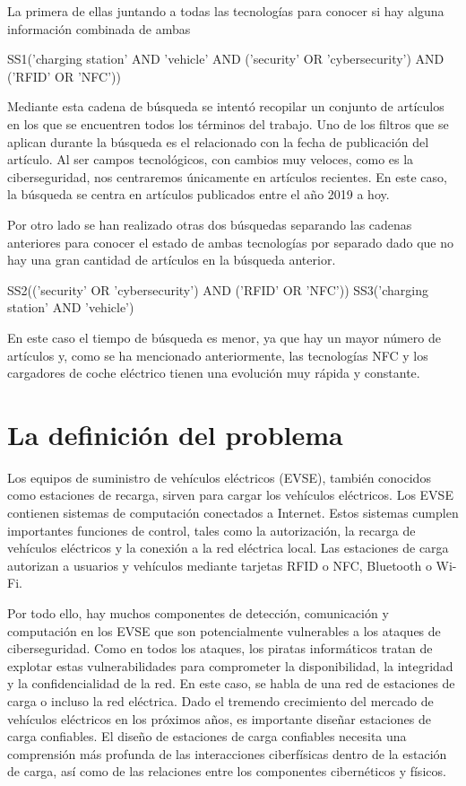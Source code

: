 \documentclass[12pt,a4paper,onecolumn,oneside]{report}
\begin{document}
La primera de ellas juntando a todas las tecnologías para conocer si hay alguna información combinada de ambas

SS1('charging station' AND 'vehicle' AND ('security' OR 'cybersecurity') AND ('RFID' OR 'NFC'))

Mediante esta cadena de búsqueda se intentó recopilar un conjunto de artículos en los que se encuentren todos los términos del trabajo. Uno de los filtros que se aplican durante la búsqueda es el relacionado con la fecha de publicación del artículo. Al ser campos tecnológicos, con cambios muy veloces, como es la ciberseguridad, nos centraremos únicamente en artículos recientes. En este caso, la búsqueda se centra en artículos publicados entre el año 2019 a hoy.

Por otro lado se han realizado otras dos búsquedas separando las cadenas anteriores para conocer el estado de ambas tecnologías por separado dado que no hay una gran cantidad de artículos en la búsqueda anterior.

SS2(('security' OR 'cybersecurity') AND ('RFID' OR 'NFC'))
SS3('charging station' AND 'vehicle')

En este caso el tiempo de búsqueda es menor, ya que hay un mayor número de artículos y, como se ha mencionado anteriormente, las tecnologías NFC y los cargadores de coche eléctrico tienen una evolución muy rápida y constante.



\section{La definición del problema}

Los equipos de suministro de vehículos eléctricos (EVSE), también conocidos como estaciones de recarga, sirven para cargar los vehículos eléctricos. Los EVSE contienen sistemas de computación conectados a Internet. Estos sistemas cumplen importantes funciones de control, tales como la autorización, la recarga de vehículos eléctricos y la conexión a la red eléctrica local. Las estaciones de carga autorizan a usuarios y vehículos mediante tarjetas RFID o NFC, Bluetooth o Wi-Fi.

Por todo ello, hay muchos componentes de detección, comunicación y computación en los EVSE que son potencialmente vulnerables a los ataques de ciberseguridad. Como en todos los ataques, los piratas informáticos tratan de explotar estas vulnerabilidades para comprometer la disponibilidad, la integridad y la confidencialidad de la red. En este caso, se habla de una red de estaciones de carga o incluso la red eléctrica. Dado el tremendo crecimiento del mercado de vehículos eléctricos en los próximos años, es importante diseñar estaciones de carga confiables. El diseño de estaciones de carga confiables necesita una comprensión más profunda de las interacciones ciberfísicas dentro de la estación de carga, así como de las relaciones entre los componentes cibernéticos y físicos. 
\end{document}

